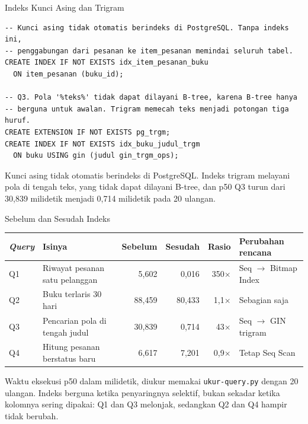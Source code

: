 \documentclass[aspectratio=169, table, 12pt]{beamer}
\begin{document}
\begin{frame}[fragile]{{\Large Indeks Kunci Asing dan Trigram}}
  \vspace{2pt}
\begin{lstlisting}[style=SqlStyle]
-- Kunci asing tidak otomatis berindeks di PostgreSQL. Tanpa indeks ini,
-- penggabungan dari pesanan ke item_pesanan memindai seluruh tabel.
CREATE INDEX IF NOT EXISTS idx_item_pesanan_buku
  ON item_pesanan (buku_id);

-- Q3. Pola '%teks%' tidak dapat dilayani B-tree, karena B-tree hanya
-- berguna untuk awalan. Trigram memecah teks menjadi potongan tiga huruf.
CREATE EXTENSION IF NOT EXISTS pg_trgm;
CREATE INDEX IF NOT EXISTS idx_buku_judul_trgm
  ON buku USING gin (judul gin_trgm_ops);
\end{lstlisting}

  \vspace{2pt}
  {\footnotesize Kunci asing tidak otomatis berindeks di PostgreSQL. Indeks
  trigram melayani pola di tengah teks, yang tidak dapat dilayani B-tree, dan
  p50 Q3 turun dari 30,839 milidetik menjadi 0,714 milidetik pada 20
  ulangan.}
\end{frame}

\begin{frame}{{\Large Sebelum dan Sesudah Indeks}}
  \vspace{5pt}
  {\centering
  {\footnotesize
  \begin{tabularx}{\textwidth}{lXrrrl}
    \hline
    \textbf{\textit{Query}} & \textbf{Isinya} & \textbf{Sebelum} & \textbf{Sesudah} & \textbf{Rasio} & \textbf{Perubahan rencana} \\
    \hline
    Q1 & Riwayat pesanan satu pelanggan & 5,602 & 0,016 & 350$\times$ & Seq $\rightarrow$ Bitmap Index \\
    \hline
    Q2 & Buku terlaris 30 hari & 88,459 & 80,433 & 1,1$\times$ & Sebagian saja \\
    \hline
    Q3 & Pencarian pola di tengah judul & 30,839 & 0,714 & 43$\times$ & Seq $\rightarrow$ GIN trigram \\
    \hline
    Q4 & Hitung pesanan berstatus baru & 6,617 & 7,201 & 0,9$\times$ & Tetap Seq Scan \\
    \hline
  \end{tabularx}}\par}

  \vspace{8pt}
  {\footnotesize Waktu eksekusi p50 dalam milidetik, diukur memakai
  \texttt{ukur-query.py} dengan 20 ulangan. Indeks berguna ketika penyaringnya
  selektif, bukan sekadar ketika kolomnya sering dipakai: Q1 dan Q3 melonjak,
  sedangkan Q2 dan Q4 hampir tidak berubah.}
\end{frame}
\end{document}
